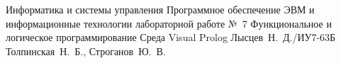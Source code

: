 \documentclass{bmstu}
\begin{document}
	
	\makereporttitle
	{Информатика и системы управления} %
	{Программное обеспечение ЭВМ и информационные технологии}
	{лабораторной работе №~7} %
	{Функциональное и логическое программирование} %
	{Среда Visual Prolog} %
	{} %
	{Лысцев~Н.~Д./ИУ7-63Б} %
	{Толпинская~Н.~Б., Строганов~Ю.~В.} %
	{}
	
	
	
	
	
\end{document}
